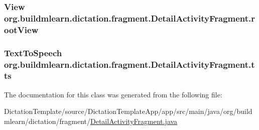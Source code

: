\subsubsection[{\texorpdfstring{root\+View}{rootView}}]{\setlength{\rightskip}{0pt plus 5cm}View org.\+buildmlearn.\+dictation.\+fragment.\+Detail\+Activity\+Fragment.\+root\+View\hspace{0.3cm}{\ttfamily [private]}}\hypertarget{classorg_1_1buildmlearn_1_1dictation_1_1fragment_1_1DetailActivityFragment_a43c90b2bd0e909925b5adf1051787937}{}\label{classorg_1_1buildmlearn_1_1dictation_1_1fragment_1_1DetailActivityFragment_a43c90b2bd0e909925b5adf1051787937}
\subsubsection[{\texorpdfstring{tts}{tts}}]{\setlength{\rightskip}{0pt plus 5cm}Text\+To\+Speech org.\+buildmlearn.\+dictation.\+fragment.\+Detail\+Activity\+Fragment.\+tts\hspace{0.3cm}{\ttfamily [private]}}\hypertarget{classorg_1_1buildmlearn_1_1dictation_1_1fragment_1_1DetailActivityFragment_a6506b1e77243b1a0dbe82a884aa2c9b7}{}\label{classorg_1_1buildmlearn_1_1dictation_1_1fragment_1_1DetailActivityFragment_a6506b1e77243b1a0dbe82a884aa2c9b7}


The documentation for this class was generated from the following file\+:\begin{DoxyCompactItemize}
\item 
Dictation\+Template/source/\+Dictation\+Template\+App/app/src/main/java/org/buildmlearn/dictation/fragment/\hyperlink{DictationTemplate_2source_2DictationTemplateApp_2app_2src_2main_2java_2org_2buildmlearn_2dictatid1c47e4a090d94dec80c4479897b3a2c}{Detail\+Activity\+Fragment.\+java}\end{DoxyCompactItemize}
